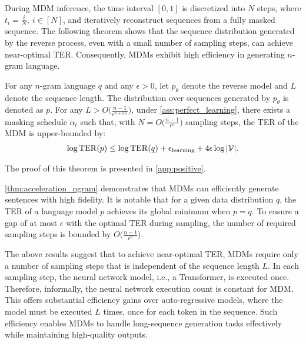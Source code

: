 During MDM inference, the time interval $[0, 1]$ is discretized into $N$ steps, where $t_i = \frac{i}{N},\ i \in [N]$, and iteratively reconstruct sequences from a fully masked sequence. The following theorem shows that the sequence distribution generated by the reverse process, even with a small number of sampling steps, can achieve near-optimal TER. Consequently, MDMs exhibit high efficiency in generating $n$-gram language.
\begin{theorem}
\label{thm:acceleration_ngram}
    For any $n$-gram language $q$ and any $\epsilon > 0$, let $p_\mathsf{\theta}$ denote the reverse model and $L$ denote the sequence length. The distribution over sequences generated by $p_\mathsf{\theta}$ is denoted as $p$. For any $L>O\big( \frac{n-1}{\epsilon^{n+0.5}}\big)$, under \cref{ass:perfect_learning}, there exists a masking schedule $\alpha_t$ such that, with $N = O\big( \frac{n-1}{\epsilon^n}\big)$ sampling steps, the TER of the MDM is upper-bounded by:
    \begin{equation}
        \begin{gathered}
            \log\operatorname{TER}(p) \leq \log\operatorname{TER}(q) + \epsilon_\text{learning} + 4\epsilon\log |{\mathcal{V}}|. \\
        \end{gathered}
    \end{equation}
\end{theorem}

The proof of this theorem is presented in \cref{app:positive}.

\cref{thm:acceleration_ngram} demonstrates that MDMs can efficiently generate sentences with high fidelity. It is notable that for a given data distribution $q$, the TER of a language model $p$ achieves its global minimum when $p = q$. To ensure a gap of at most $\epsilon$ with the optimal TER during sampling, the number of required sampling steps is bounded by $O\big( \frac{n-1}{\epsilon^n}\big)$. 

The above results suggest that to achieve near-optimal TER, MDMs require only a number of sampling steps that is independent of the sequence length $L$.
In each sampling step, the neural network model, i.e., a Transformer, is executed once. Therefore, informally, the neural network execution count is constant for MDM. This offers substantial efficiency gains over auto-regressive models, where the model must be executed $L$ times, once for each token in the sequence. Such efficiency enables MDMs to handle long-sequence generation tasks effectively while maintaining high-quality outputs.

